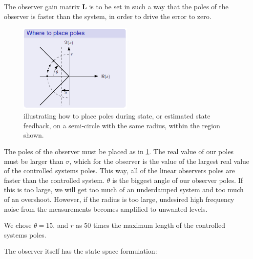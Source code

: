 The observer gain matrix $\bm{L}$ is to be set in such a way that the
poles of the observer is faster than the system, in order to drive the
error to zero.
\begin{figure}[H]
  \caption{ illustrating how to place poles during state, or estimated
    state feedback, on a semi-circle with the same radius, within the
    region shown.}
  \label{fig:pole_placement}
  \begin{center}
    \includegraphics[width=0.5\textwidth]{images/pole_placement}
  \end{center}
\end{figure}
The
poles of the observer must be placed as in
\cref{fig:pole_placement}. The real value of our poles must be larger
than $\sigma$, which for the observer is the value of the largest real
value of the controlled systems poles. This way, all of the linear
observers poles are faster than the controlled system. $\theta$ is the
biggest angle of our observer poles. If this is too large, we will get
too much of an underdamped system and too much of an
overshoot. However, if the radius is too large, undesired high
frequency noise from the measurements becomes amplified to unwanted
levels.

We chose $\theta = 15$, and $r$ as 50 times the maximum length of the
controlled systems poles.

The observer itself has the state space formulation:

